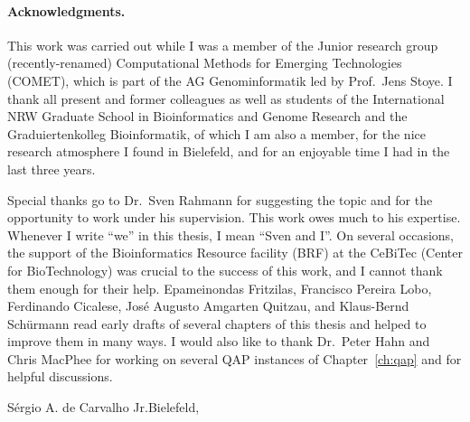 \paragraph{Acknowledgments.}
This work was carried out while I was a member of the Junior research group
(recently-renamed) Computational Methods for Emerging Technologies (COMET), which
is part of the AG Genominformatik led by Prof.~Jens Stoye. I thank all present
and former colleagues as well as students of the International NRW Graduate
School in Bioinformatics and Genome Research and the Graduiertenkolleg
Bioinformatik, of which I am also a member, for the nice research atmosphere I
found in Bielefeld, and for an enjoyable time I had in the last three years.

Special thanks go to Dr.~Sven Rahmann for suggesting the topic and for the
opportunity to work under his supervision. This work owes much to his expertise.
Whenever I write ``we'' in this thesis, I mean ``Sven and I''. On several
occasions, the support of the Bioinformatics Resource facility (BRF) at the
CeBiTec (Center for BioTechnology) was crucial to the success of this work,
and I cannot thank them enough for their help. Epameinondas Fritzilas,
Francisco Pereira Lobo, Ferdinando Cicalese, Jos\'e Augusto Amgarten Quitzau,
and Klaus-Bernd Sch\"urmann read early drafts of several chapters of this thesis
and helped to improve them in many ways. I would also like to thank Dr.~Peter
Hahn and Chris MacPhee for working on several QAP instances of
Chapter~\ref{ch:qap} and for helpful discussions.

\vspace*{6ex}
S\'ergio A. de Carvalho Jr.\hfill Bielefeld, \handindate
